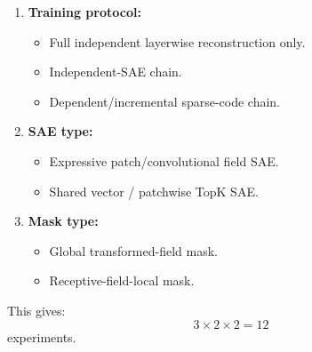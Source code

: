 \documentclass[11pt]{article}
\begin{document}
\begin{enumerate}[leftmargin=*]
    \item \textbf{Training protocol:}
    \begin{itemize}
        \item Full independent layerwise reconstruction only.
        \item Independent-SAE chain.
        \item Dependent/incremental sparse-code chain.
    \end{itemize}

    \item \textbf{SAE type:}
    \begin{itemize}
        \item Expressive patch/convolutional field SAE.
        \item Shared vector / patchwise TopK SAE.
    \end{itemize}

    \item \textbf{Mask type:}
    \begin{itemize}
        \item Global transformed-field mask.
        \item Receptive-field-local mask.
    \end{itemize}
\end{enumerate}

This gives:
\[
3\times 2\times 2=12
\]
experiments.
\end{document}
